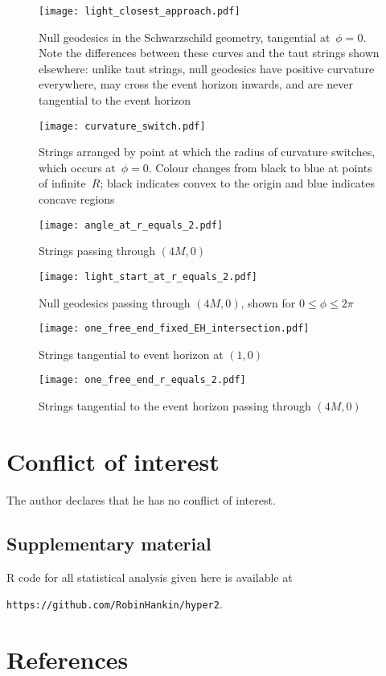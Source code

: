 \documentclass[review]{elsarticle}
\begin{document}
\begin{figure}[p] %
\centering
\texttt{[image: light\_closest\_approach.pdf]}
\caption{Null geodesics in the Schwarzschild geometry, tangential
  at~$\phi=0$.  Note the differences between these curves and the taut
  strings shown elsewhere: unlike taut strings, null geodesics have
  positive curvature everywhere, may cross the event horizon inwards,
  and are never tangential to the event horizon}
\label{light_closest_approach}
\end{figure}

\begin{figure}[p]
\centering
\texttt{[image: curvature\_switch.pdf]} %
\caption{Strings arranged by point at which the radius of curvature
  switches, which occurs at~$\phi=0$.  Colour changes from black to
  blue at points of infinite~$R$; black indicates convex to the origin
  and blue indicates concave regions}
\label{curvature_switch}
\end{figure}

\begin{figure}[p]
\centering
\texttt{[image: angle\_at\_r\_equals\_2.pdf]} %
\caption{Strings passing through $(4M,0)$}
\label{strings_r_equals_2}
\end{figure}

\begin{figure}[p]
\centering
\texttt{[image: light\_start\_at\_r\_equals\_2.pdf]} %
\caption{Null geodesics passing through $(4M,0)$, shown for
  $0\leqslant\phi\leqslant 2\pi$}
\label{light_r_equals_2}
\end{figure}

\begin{figure}[p] %
\centering
\texttt{[image: one\_free\_end\_fixed\_EH\_intersection.pdf]}
\caption{Strings tangential to event horizon at $(1,0)$}
\label{fixed_EH_intersection}
\end{figure}

\begin{figure}[p] %
\centering
\texttt{[image: one\_free\_end\_r\_equals\_2.pdf]}
\caption{Strings tangential to the event horizon passing through $(4M,0)$}
\label{one_free_end_r_equals_2}
\end{figure}



 \section*{Conflict of interest}
 The author declares that he has no conflict of interest.

\subsection*{Supplementary material}

R code for all statistical analysis given here is available at

{\tt https://github.com/RobinHankin/hyper2}.

\section*{References}


\end{document}
